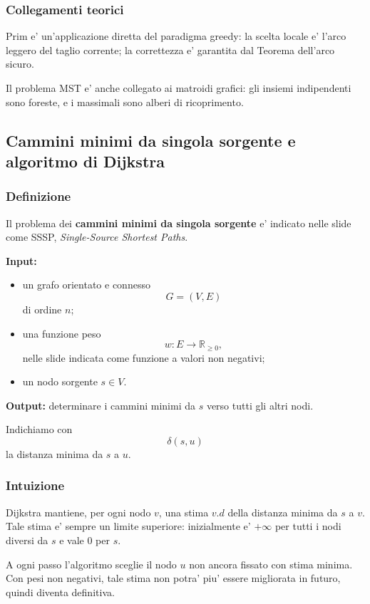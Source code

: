 \subsubsection{Collegamenti teorici}
Prim e' un'applicazione diretta del paradigma greedy: la scelta locale e' l'arco leggero del taglio corrente; la correttezza e' garantita dal Teorema dell'arco sicuro.

Il problema MST e' anche collegato ai matroidi grafici: gli insiemi indipendenti sono foreste, e i massimali sono alberi di ricoprimento.

\subsection{Cammini minimi da singola sorgente e algoritmo di Dijkstra}

\subsubsection{Definizione}
Il problema dei \textbf{cammini minimi da singola sorgente} e' indicato nelle slide come SSSP, \emph{Single-Source Shortest Paths}.

\textbf{Input:}
\begin{itemize}
	\item un grafo orientato e connesso
	\[
	G=(V,E)
	\]
	di ordine $n$;
	\item una funzione peso
	\[
	w:E\to\mathbb{R}_{\ge 0},
	\]
	nelle slide indicata come funzione a valori non negativi;
	\item un nodo sorgente $s\in V$.
\end{itemize}

\textbf{Output:} determinare i cammini minimi da $s$ verso tutti gli altri nodi.

Indichiamo con
\[
\delta(s,u)
\]
la distanza minima da $s$ a $u$.

\subsubsection{Intuizione}
Dijkstra mantiene, per ogni nodo $v$, una stima $v.d$ della distanza minima da $s$ a $v$. Tale stima e' sempre un limite superiore: inizialmente e' $+\infty$ per tutti i nodi diversi da $s$ e vale $0$ per $s$.

A ogni passo l'algoritmo sceglie il nodo $u$ non ancora fissato con stima minima. Con pesi non negativi, tale stima non potra' piu' essere migliorata in futuro, quindi diventa definitiva.

